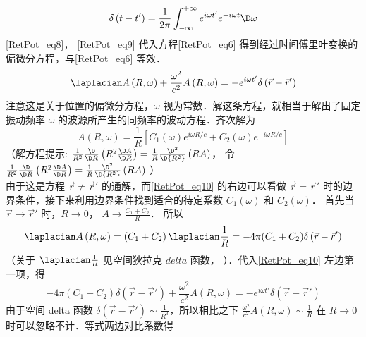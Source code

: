 \begin{equation}\label{RetPot_eq9}
\delta \left( {t - t'} \right) = \frac{1}{{2\pi }}\int_{ - \infty }^{ + \infty } {{e^{i\omega t'}}{e^{ - i\omega t}}\D \omega } 
\end{equation} 
\autoref{RetPot_eq8}， \autoref{RetPot_eq9} 代入方程\autoref{RetPot_eq6} 得到经过时间傅里叶变换的偏微分方程，与\autoref{RetPot_eq6} 等效． 
\begin{equation}\label{RetPot_eq10}
{\laplacian}A\left( {R,\omega } \right) + \frac{{{\omega ^2}}}{{{c^2}}}A\left( {R,\omega } \right) =  - {e^{i\omega t'}}\delta \left( {\vec r - \vec r'} \right)
\end{equation} 
注意这是关于位置的偏微分方程，$\omega$ 视为常数．解这条方程，就相当于解出了固定振动频率 $\omega$ 的波源所产生的同频率的波动方程．齐次解为
\begin{equation}\label{RetPot_eq11}
A\left( {R,\omega } \right) = \frac{1}{R}\left[ {{C_1}\left( \omega  \right){e^{i\omega R/c}} + {C_2}\left( \omega  \right){e^{ - i\omega R/c}}} \right]
\end{equation} 
（解方程提示: $\frac{1}{{{R^2}}}\frac{\D }{{\D R}}\left( {{R^2}\frac{{\D A}}{{\D R}}} \right) = \frac{1}{R}\frac{{{\D ^2}}}{{\D {R^2}}}\left( {RA} \right)$， 令 $\frac{1}{{{R^2}}}\frac{\D }{{\D R}}\left( {{R^2}\frac{{\D A}}{{\D R}}} \right) = \frac{1}{R}\frac{{{\D ^2}}}{{\D {R^2}}}\left( {RA} \right)$ ）\\
由于这是方程 $\vec r \ne \vec r'$ 的通解，而\autoref{RetPot_eq10} 的右边可以看做 $\vec r = \vec r'$ 时的边界条件，接下来利用边界条件找到适合的待定系数 ${C_1}\left( \omega  \right)$ 和 ${C_2}\left( \omega  \right)$．  
首先当 $\vec r \to \vec r'$ 时，$R \to 0$， $A \to \frac{{{C_1} + {C_2}}}{R}$． 所以
\begin{equation}
{\laplacian}A\left( {R,\omega } \right) = \left( {{C_1} + {C_2}} \right){\laplacian}\frac{1}{R} =  - 4\pi ({C_1} + {C_2})\delta \left( {\vec r - \vec r'} \right)
\end{equation} 
（关于 ${\laplacian}\frac{1}{R}$ 见空间狄拉克 $delta$ 函数，%
）．代入\autoref{RetPot_eq10} 左边第一项，得
\begin{equation}
 - 4\pi ({C_1} + {C_2})\delta \left( {\vec r - \vec r'} \right) + \frac{{{\omega ^2}}}{{{c^2}}}A\left( {R,\omega } \right) =  - {e^{i\omega t'}}\delta \left( {\vec r - \vec r'} \right)
\end{equation} 
由于空间 delta 函数 $\delta \left( {\vec r - \vec r'} \right) \sim \frac{1}{{{R^3}}}$，所以相比之下 $\frac{{{\omega ^2}}}{{{c^2}}}A\left( {R,\omega } \right) \sim \frac{1}{R}$ 在 $R \to 0$ 时可以忽略不计．等式两边对比系数得
